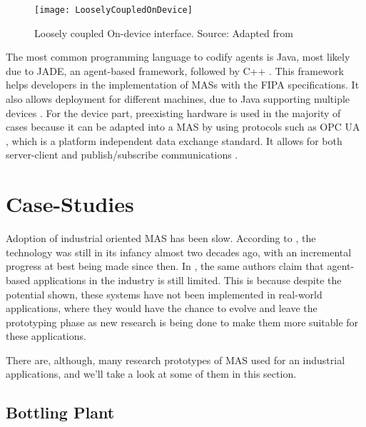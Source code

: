 \begin{figure}
	\centering
	\texttt{[image: LooselyCoupledOnDevice]}
	\caption{Loosely coupled On-device interface. Source: Adapted from \cite{8591641}}
\end{figure}


The most common programming language to codify agents is Java, most likely due to JADE, an agent-based framework, followed by C++ \cite{8591641}. This framework helps developers in the implementation of MASs  with the FIPA specifications. It also allows deployment for different machines, due to Java supporting multiple devices \cite{JADE_website}.
For the device part, preexisting hardware is used in the majority of cases because it can be adapted into a MAS by using protocols such as OPC UA \cite{8591641}, which is a platform independent data exchange standard. It allows for both server-client and publish/subscribe communications \cite{OPCUA_website}.


 

\section{Case-Studies}

Adoption of industrial oriented MAS has been slow. According to \cite{karnouskos02}, the technology was still in its infancy almost two decades ago, with an incremental progress at best being made since then. In \cite{Karnouskos2019}, the same authors claim that agent-based applications in the industry is still limited. This is because despite the potential shown, these systems have not been implemented in real-world applications, where they would have the chance to evolve and leave the prototyping phase as new research is being done to make them more suitable for these applications.

There are, although, many research prototypes of MAS used for an industrial applications, and we'll take a look at some of them in this section.

\subsection{Bottling Plant}

